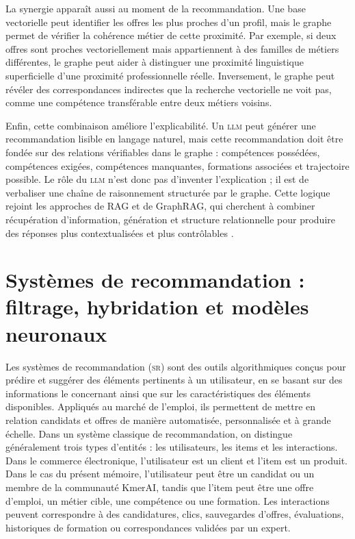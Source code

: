 \documentclass[12pt,twoside]{report}
\newcommand{\LLM}{\textsc{llm}}
\begin{document}
La synergie apparaît aussi au moment de la recommandation. Une base vectorielle peut identifier les offres les plus proches d'un profil, mais le graphe permet de vérifier la cohérence métier de cette proximité. Par exemple, si deux offres sont proches vectoriellement mais appartiennent à des familles de métiers différentes, le graphe peut aider à distinguer une proximité linguistique superficielle d'une proximité professionnelle réelle. Inversement, le graphe peut révéler des correspondances indirectes que la recherche vectorielle ne voit pas, comme une compétence transférable entre deux métiers voisins.

Enfin, cette combinaison améliore l'explicabilité. Un \LLM{} peut générer une recommandation lisible en langage naturel, mais cette recommandation doit être fondée sur des relations vérifiables dans le graphe : compétences possédées, compétences exigées, compétences manquantes, formations associées et trajectoire possible. Le rôle du \LLM{} n'est donc pas d'inventer l'explication ; il est de verbaliser une chaîne de raisonnement structurée par le graphe. Cette logique rejoint les approches de RAG et de GraphRAG, qui cherchent à combiner récupération d'information, génération et structure relationnelle pour produire des réponses plus contextualisées et plus contrôlables \cite{lewis2020rag,hogan2021knowledge}.
 



\section{Systèmes de recommandation : filtrage, hybridation et modèles neuronaux}
Les systèmes de recommandation (\textsc{sr}) sont des outils algorithmiques conçus pour prédire
et suggérer des éléments pertinents à un utilisateur, en se basant sur des informations le
concernant ainsi que sur les caractéristiques des éléments disponibles. Appliqués au marché de
l'emploi, ils permettent de mettre en relation candidats et offres de manière automatisée,
personnalisée et à grande échelle.
Dans un système classique de recommandation, on distingue généralement trois types d'entités : les utilisateurs, les items et les interactions. Dans le commerce électronique, l'utilisateur est un client et l'item est un produit. Dans le cas du présent mémoire, l'utilisateur peut être un candidat ou un membre de la communauté KmerAI, tandis que l'item peut être une offre d'emploi, un métier cible, une compétence ou une formation. Les interactions peuvent correspondre à des candidatures, clics, sauvegardes d'offres, évaluations, historiques de formation ou correspondances validées par un expert.
\end{document}
